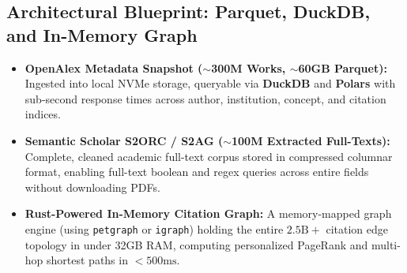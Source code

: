 \documentclass[10pt,a4paper]{article}
\begin{document}
\subsection{Architectural Blueprint: Parquet, DuckDB, and In-Memory Graph}
\begin{itemize}[leftmargin=1.4em, itemsep=2pt, topsep=2pt]
    \item \textbf{OpenAlex Metadata Snapshot ($\sim$300M Works, $\sim$60GB Parquet):} Ingested into local NVMe storage, queryable via \textbf{DuckDB} and \textbf{Polars} with sub-second response times across author, institution, concept, and citation indices.
    \item \textbf{Semantic Scholar S2ORC / S2AG ($\sim$100M Extracted Full-Texts):} Complete, cleaned academic full-text corpus stored in compressed columnar format, enabling full-text boolean and regex queries across entire fields without downloading PDFs.
    \item \textbf{Rust-Powered In-Memory Citation Graph:} A memory-mapped graph engine (using \texttt{petgraph} or \texttt{igraph}) holding the entire $2.5\text{B}+$ citation edge topology in under 32GB RAM, computing personalized PageRank and multi-hop shortest paths in $<500\text{ms}$.
\end{itemize}
\end{document}
